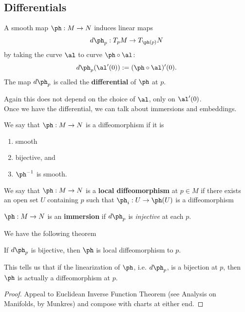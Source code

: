 \subsection{Differentials}
\begin{df}
A smooth map $\ph:M\to N$ induces linear maps
\[
d\ph_p:T_pM\to T_{\ph(p)}N
\]
by taking the curve $\al$ to curve $\ph\circ \al$:
\[
d\ph_p(\al'(0)):= (\ph\circ \al)'(0).
\]
The map $d\ph_p$ is called the \textbf{differential} of $\ph$ at $p$.
\end{df}
Again this does not depend on the choice of $\al$, only on $\al'(0)$.\\

\vskip0.15in
Once we have the differential, we can talk about immersions and embeddings. 
\begin{df}
We say that 
$\ph:M\to N$ is a diffeomorphism if it is
\begin{enumerate}
\item
smooth
\item
bijective, and
\item $\ph^{-1}$ is smooth.
\end{enumerate}
\end{df}
\begin{df}
We say that $\ph:M\to N$ is a \textbf{local diffeomorphism} at $p\in M$ if there exists an open set $U$ containing $p$ such that $\ph_i:U\to \ph(U)$ is a diffeomorphism
\end{df}
\begin{df}
$\ph:M\to N$ is an \textbf{immersion} if $d\ph_p$ is \emph{injective} at each $p$.
\end{df}
We have the following theorem
\begin{thm}
If $d\ph_p$ is bijective, then $\ph$ is local diffeomorphism to $p$.
\end{thm}
This tells us that if the linearization of $\ph$, i.e. $d\ph_p$, is a bijection at $p$, then  $\ph$ is actually a diffeomorphism at $p$.
\begin{proof}
Appeal to Euclidean Inverse Function Theorem (see Analysis on Manifolds, by Munkres) and compose with charts at either end.
\end{proof}
